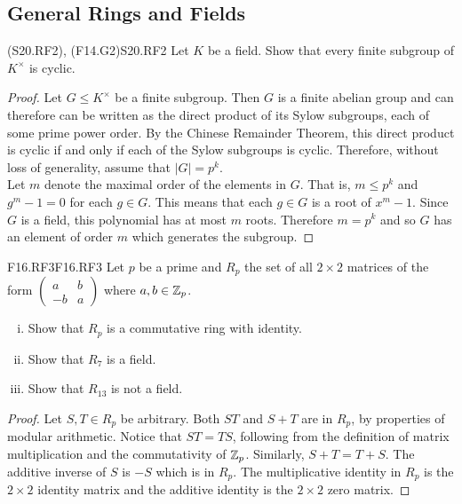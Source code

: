 \documentclass[../AlgebraQualSolutions.tex]{subfiles}
\begin{document}
\subsection{General Rings and Fields}

\begin{prob}{(S20.RF2), (F14.G2)}{S20.RF2}
Let $K$ be a field. Show that every finite subgroup of $K^\times$ is cyclic.
\end{prob}

\begin{proof}
	Let $G \leq K^\times$ be a finite subgroup. Then $G$ is a finite abelian group and can therefore can be written as the direct product of its Sylow subgroups, each of some prime power order. By the Chinese Remainder Theorem, this direct product is cyclic if and only if each of the Sylow subgroups is cyclic. Therefore, without loss of generality, assume that $|G| = p^k$.\\

	Let $m$ denote the maximal order of the elements in $G$. That is, $m \leq p^k$ and $g^m - 1 = 0$ for each $g \in G$. This  means that each $g \in G$ is a root of $x^m - 1$. Since $G$ is a field, this polynomial has at most $m$ roots. Therefore $m = p^k$ and so $G$ has an element of order $m$ which generates the subgroup.
\end{proof}

\begin{prob}{F16.RF3}{F16.RF3}
    Let $p$ be a prime and $R_p$ the set of all $2 \times 2$ matrices of the form $\begin{pmatrix} a & b\\ -b & a\end{pmatrix}$ where $a,b \in \mathbb{Z}_p$.

    \begin{enumerate}[(i)]
        \item Show that $R_p$ is a commutative ring with identity.
        \item Show that $R_7$ is a field.
        \item Show that $R_{13}$ is not a field.
    \end{enumerate}
\end{prob}

\begin{proof}
    Let $S,T \in R_p$ be arbitrary. Both $ST$ and $S + T$ are in $R_p$, by properties of modular arithmetic. Notice that $ST = TS$, following from the definition of matrix multiplication and the commutativity of $\mathbb{Z}_p$. Similarly, $S + T = T + S$. The additive inverse of $S$ is $-S$ which is in $R_p$. The multiplicative identity in $R_p$ is the $2 \times 2$ identity matrix and the additive identity is the $2 \times 2$ zero matrix.
\end{proof}
\end{document}
